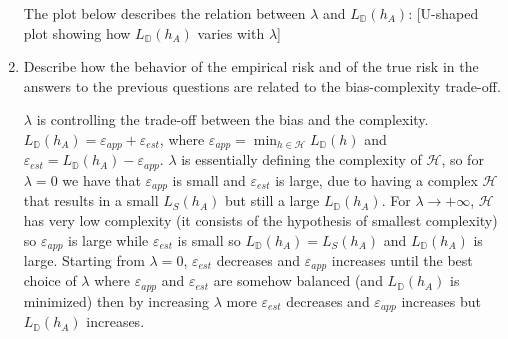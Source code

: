 \documentclass[a4paper,11pt,oneside]{book}
\newcounter{question}[section]
\begin{document}
\begin{enumerate}
\begin{solution}
            The plot below describes the relation between $\lambda$ and $L_\mathbb{D}(h_A)$:
            [U-shaped plot showing how $L_\mathbb{D}(h_A)$ varies with $\lambda$]
        \end{solution}
    \item Describe how the behavior of the empirical risk and of the true risk in the answers to the previous questions are related to the bias-complexity trade-off.
        \begin{solution}
            $\lambda$ is controlling the trade-off between the bias and the complexity. $L_\mathbb{D}(h_A) = \varepsilon_{app} + \varepsilon_{est}$, where $\varepsilon_{app} = \min_{h \in \mathcal{H}} L_\mathbb{D}(h)$ and $\varepsilon_{est} = L_\mathbb{D}(h_A) - \varepsilon_{app}$. $\lambda$ is essentially defining the complexity of $\mathcal{H}$, so for $\lambda=0$ we have that $\varepsilon_{app}$ is small and $\varepsilon_{est}$ is large, due to having a complex $\mathcal{H}$ that results in a small $L_S(h_A)$ but still a large $L_\mathbb{D}(h_A)$. For $\lambda \to +\infty$, $\mathcal{H}$ has very low complexity (it consists of the hypothesis of smallest complexity) so $\varepsilon_{app}$ is large while $\varepsilon_{est}$ is small so $L_\mathbb{D}(h_A) = L_S(h_A)$ and $L_\mathbb{D}(h_A)$ is large. Starting from $\lambda=0$, $\varepsilon_{est}$ decreases and $\varepsilon_{app}$ increases until the best choice of $\lambda$ where $\varepsilon_{app}$ and $\varepsilon_{est}$ are somehow balanced (and $L_\mathbb{D}(h_A)$ is minimized) then by increasing $\lambda$ more $\varepsilon_{est}$ decreases and $\varepsilon_{app}$ increases but $L_\mathbb{D}(h_A)$ increases.
        \end{solution}
\end{enumerate}
\end{document}
